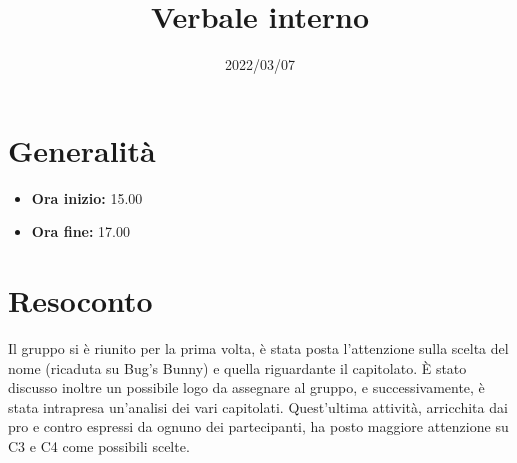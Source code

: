\documentclass{classes/base}
\title{Verbale interno}
\date{2022/03/07}
\author{\giulio}
\renewcommand{\maketitle}{
    
}
\begin{document}
    \maketitle

    \section{Generalità}
    \begin{itemize}
        \item \textbf{Ora inizio:} 15.00
        \item \textbf{Ora fine:} 17.00
    \end{itemize}

    \section{Resoconto}
    Il gruppo si è riunito per la prima volta, è stata posta l'attenzione sulla scelta del nome (ricaduta su Bug's Bunny) e quella riguardante il capitolato.  
    È stato discusso inoltre un possibile logo da assegnare al gruppo, e successivamente, è stata intrapresa un'analisi dei vari capitolati.
    Quest'ultima attività, arricchita dai pro e contro espressi da ognuno dei partecipanti, ha posto maggiore attenzione su C3 e C4 come possibili scelte.
\end{document}
